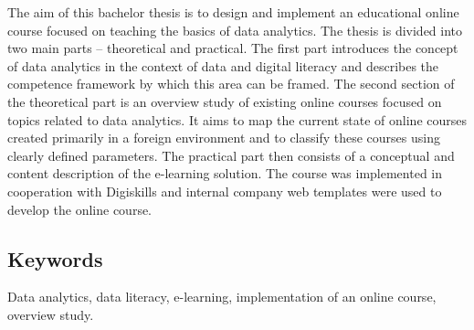 \documentclass[a4paper,12pt,openany,twoside]{book} %
\begin{document}
The aim of this bachelor thesis is to design and implement an educational online course focused on teaching the basics of data analytics. The thesis is divided into two main parts – theoretical and practical. The first part introduces the concept of data analytics in the context of data and digital literacy and describes the competence framework by which this area can be framed. The second section of the theoretical part is an overview study of existing online courses focused on topics related to data analytics. It aims to map the current state of online courses created primarily in a foreign environment and to classify these courses using clearly defined parameters. The practical part then consists of a conceptual and content description of the e-learning solution. The course was implemented in cooperation with Digiskills and internal company web templates were used to develop the online course.

\subsection*{Keywords}

Data analytics, data literacy, e-learning, implementation of an online course, overview study.


\clearpage

\tableofcontents

\cleardoublepage
{}








\clearpage

\pagestyle{plain}

\begin{spacing}{1.05}
\printbibliography[title={Seznam použitých zdrojů}]
\end{spacing}


\end{document}
